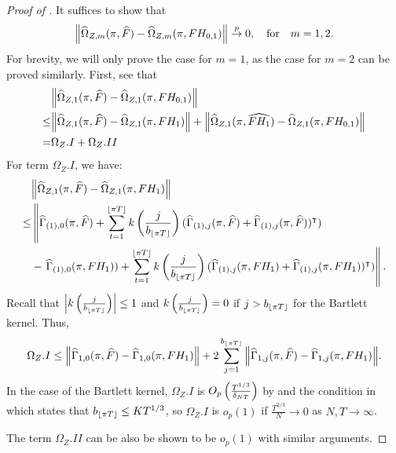 \documentclass[12pt]{article}
\newcommand*{\tran}{\intercal}
\theoremstyle{plain}
\numberwithin{equation}{section}
\begin{document}
\begin{proof}[Proof of ]
It suffices to show that
\begin{align*}
\norm{
	\widehat{\Omega}_{Z, m}(\pi, \widehat{F}) - \widehat{\Omega}_{Z, m}(\pi, F H_{0, 1})
} 
\overset{p}{\to} 0, \quad \text{for} \quad m = 1, 2.
\end{align*}
For brevity, we will only prove the case for $m = 1$, as the case for $m = 2$ can be proved similarly. First, see that
\begin{align*}
&\norm{
	\widehat{\Omega}_{Z, 1}(\pi, \widehat{F}) - \widehat{\Omega}_{Z, 1}(\pi, F H_{0, 1})
} \\ 
\leq &\norm{\widehat{\Omega}_{Z, 1}(\pi, \widehat{F}) - \widehat{\Omega}_{Z, 1}(\pi, F H_{1})} +
\norm{\widehat{\Omega}_{Z, 1}(\pi, \widehat{FH_1}) - \widehat{\Omega}_{Z, 1}(\pi, F H_{0, 1})} \\
= &\Omega_Z.I + \Omega_Z.II
\end{align*}
For term $\Omega_Z.I$, we have:
\begin{align*}
&\norm{\widehat{\Omega}_{Z, 1}(\pi, \widehat{F}) - \widehat{\Omega}_{Z, 1}(\pi, FH_1)} \\
\leq &\left\lVert  
	\widehat{\Gamma}_{(1), 0} (\pi, \widehat{F}) + 
	\sumTfloor k \left( \frac{j}{b_{\floor{\pi T}}} \right) (\widehat{\Gamma}_{(1), j} (\pi, \widehat{F}) + \widehat{\Gamma}_{(1), j} (\pi, \widehat{F}))^\tran) 
	\right.  \\
	&
	- \left. 
	\widehat{\Gamma}_{(1), 0} (\pi, FH_{1})) + 
	\sumTfloor k \left( \frac{j}{b_{\floor{\pi T}}} \right) (\widehat{\Gamma}_{(1), j} (\pi, FH_{1}) + \widehat{\Gamma}_{(1), j} (\pi, FH_{1}))^\tran)
	\right\rVert
.
\end{align*}
Recall that $\abs{k \left( \frac{j}{b_{\left \lfloor \pi T \right \rfloor}} \right)} \leq 1$ and $k \left( \frac{j}{b_{\left \lfloor \pi T \right \rfloor}} \right) = 0$ if $j > b_{\left \lfloor \pi T \right \rfloor}$ for the Bartlett kernel. Thus, 
\begin{align*}
\Omega_Z.I \leq 
\norm{\widehat{\Gamma}_{1, 0}(\pi, \widehat{F}) - \widehat{\Gamma}_{1, 0}(\pi, FH_1)} + 
2 \sum_{j = 1}^{b_{\left \lfloor \pi T \right \rfloor}} \norm{
\widehat{\Gamma}_{1, j} (\pi, \widehat{F}) - \widehat{\Gamma}_{1, j} (\pi, FH_1)
}.
\end{align*}
In the case of the Bartlett kernel, $\Omega_Z.I$ is $O_p \left( \frac{T^{1/3}}{\delta_{NT}} \right)$ by  and the condition in  which states that $b_{\left \lfloor \pi T \right \rfloor} \leq K T^{1/3}$, so $\Omega_Z.I$ is $o_p(1)$ if $\frac{T^{2/3}}{N} \to 0$ as $N, T \to \infty$. 

The term $\Omega_Z.II$ can be also be shown to be $o_p(1)$ with similar arguments.
\end{proof}
\end{document}
